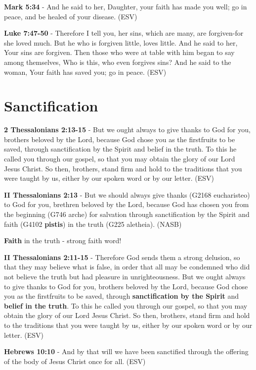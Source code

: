 \documentclass[11pt]{article}
\begin{document}
\textbf{Mark 5:34} -  And he said to her, Daughter, your faith has made you well; go in peace, and be healed of your disease.  (ESV)

\textbf{Luke 7:47-50} - Therefore I tell you, her sins, which are many, are forgiven-for she loved much. But he who is forgiven little, loves little. And he said to her, Your sins are forgiven. Then those who were at table with him began to say among themselves, Who is this, who even forgives sins? And he said to the woman, Your faith has saved you; go in peace. (ESV)

\section{Sanctification}
\label{sec:org4a5e62d}
\textbf{2 Thessalonians 2:13-15} -  But we ought always to give thanks to God for you, brothers beloved by the Lord, because God chose you as the firstfruits to be saved, through sanctification by the Spirit and belief in the truth.  To this he called you through our gospel, so that you may obtain the glory of our Lord Jesus Christ.  So then, brothers, stand firm and hold to the traditions that you were taught by us, either by our spoken word or by our letter.  (ESV)

\textbf{II Thessalonians 2:13} - But we should always give thanks (G2168 eucharisteo) to God for you, brethren beloved by the Lord, because God has chosen you from the beginning (G746 arche) for salvation through sanctification by the Spirit and faith (G4102 \textbf{pistis}) in the truth (G225 aletheia). (NASB)

\textbf{Faith} in the truth - strong faith word!

\textbf{II Thessalonians 2:11-15} - Therefore God sends them a strong delusion, so that they may believe what is false, in order that all may be condemned who did not believe the truth but had pleasure in unrighteousness. But we ought always to give thanks to God for you, brothers beloved by the Lord, because God chose you as the firstfruits to be saved, through \textbf{sanctification by the Spirit} and \textbf{belief in the truth}. To this he called you through our gospel, so that you may obtain the glory of our Lord Jesus Christ. So then, brothers, stand firm and hold to the traditions that you were taught by us, either by our spoken word or by our letter.  (ESV)

\textbf{Hebrews 10:10} - And by that will we have been sanctified through the offering of the body of Jesus Christ once for all. (ESV)
\end{document}
